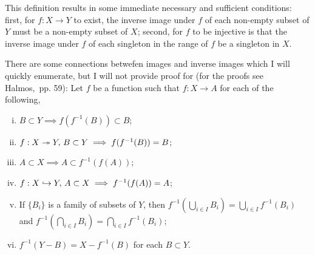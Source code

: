 \documentclass{report}
\begin{document}

    This definition results in some immediate necessary and sufficient conditions: first, for \( f : X \to Y \) to exist, the inverse image under \( f \) of each non-empty subset of \( Y \) must be a non-empty subset of \( X \); second, for \( f \) to be injective is that the inverse image under \( f \) of each singleton in the range of \( f \) be a singleton in \( X \). 



There are some connections betwefen images and inverse images which I will quickly enumerate, but I will not provide proof for (for the proofs see Halmos,~pp. 59): 
Let \( f \) be a function such that \( f : X \to A \) for each of the following, 
\begin{enumerate}[i.]
  \item \( B \subset  Y \implies f(f^{-1}(B))\subset B \);
  \item \( f : X \twoheadrightarrow   Y, \, B \subset Y \implies f(f^{-1}(B))=B\);
  \item \( A \subset X \implies A \subset  f^{-1}(f(A)) \);
  \item \( f : X \hookrightarrow  Y , \, A \subset X  \implies f^{-1}(f(A))=A \);
  \item If \( \{B_i\}   \) is a family of subsets of \( Y \), then \( f^{-1}(\bigcup_{i \in  I} B_i ) =\bigcup_{i \in  I} f^{-1}(B_i) \) and \(  f^{-1}(\bigcap_{i \in  I} B_i ) =\bigcap_{i \in  I} f^{-1}(B_i)  \);
  \item \( f^{-1}(Y-B)=X-f^{-1}(B) \) for each \( B \subset Y \).
\end{enumerate}
      
\end{document}
